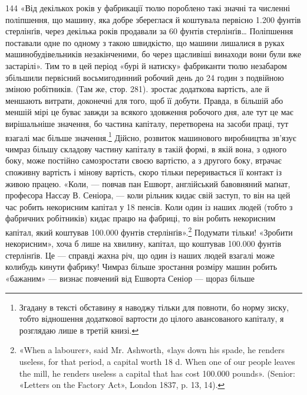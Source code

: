 144 «Від декількох років у фабрикації тюлю пороблено такі значні та
численні поліпшення, що машину, яка добре збереглася й коштувала
первісно 1.200 фунтів стерлінґів, через декілька років продавали за
60 фунтів стерлінґів\dots{} Поліпшення поставали одне по одному з такою
швидкістю, що машини лишалися в руках машинобудівельників незакінченими,
бо через щасливіші винаходи вони були вже застарілі». Тим то
в цей період «бурі й натиску» фабриканти тюлю незабаром збільшили первісний
восьмигодинний робочий день до 24 годин з подвійною зміною
робітників. (Там же, стор. 281).
зростає додаткова вартість, але й меншають витрати, доконечні
для того, щоб її добути. Правда, в більшій або меншій мірі це
буває завжди за всякого здовження робочого дня, але тут це
має вирішальніше значення, бо частина капіталу, перетворена
на засоби праці, тут взагалі має більше значення.\footnote{
Згадану в тексті обставину я наводжу тільки для повноти, бо
норму зиску, тобто відношення додаткової вартости до цілого авансованого
капіталу, я розглядаю лише в третій книзі.
} Дійсно,
розвиток машинового виробництва зв’язує чимраз більшу складову
частину капіталу в такій формі, в якій вона, з одного боку, може
постійно самозростати своєю вартістю, а з другого боку, втрачає
споживну вартість і мінову вартість, скоро тільки переривається
її контакт із живою працею. «Коли, — повчав пан Ешворт,
англійський бавовняний маґнат, професора Нассау В. Сеніора, —
коли рільник кидає свій заступ, то він на цей час робить некорисним
капітал у 18 пенсів. Коли один із наших людей (тобто
з фабричних робітників) кидає працю на фабриці, то він робить
некорисним капітал, який коштував 100.000 фунтів стерлінґів».\footnote{
«When a labourer», said Mr. Ashworth, «lays down his spade, he
renders useless, for that period, a capital worth 18 d. When one of our people
leaves the mill, he renders useless a capital that has cost 100.000 pounds».
(Senior: «Letters on the Factory Act», London 1837, p. 13, 14).
}
Подумати тільки! «Зробити некорисним», хоча б лише на хвилину,
капітал, що коштував 100.000 фунтів стерлінґів. Це — справді
жахна річ, що один із наших людей взагалі може колибудь кинути
фабрику! Чимраз більше зростання розміру машин робить «бажаним»
— визнає повчений від Ешворта Сеніор — щораз більше
